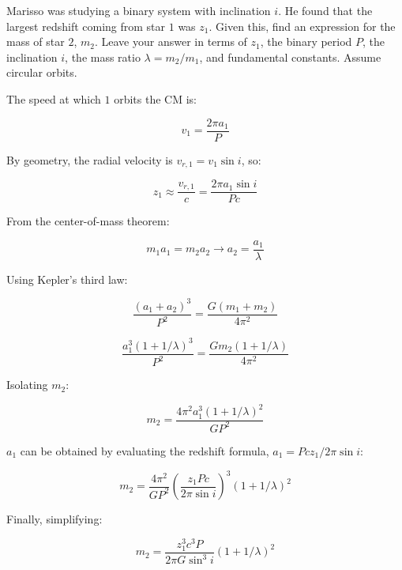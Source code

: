 \documentclass[11pt]{article}
\begin{document}
\begin{pproblem} Marisso was studying a binary system with inclination \(i\). He found that the largest redshift coming from star \(1\) was \(z_1\). Given this, find an expression for the mass of star \(2\), \(m_2\). Leave your answer in terms of \(z_1\), the binary period \(P\), the inclination \(i\), the mass ratio \(\lambda  = m_2/m_1\), and fundamental constants. Assume circular orbits.
    \begin{pssolution*}{}{}
        The speed at which \(1\) orbits the CM is:

        \[v_1 = \frac{2\pi a_1}{P}\]

        By geometry, the radial velocity is \(v_{r,1}=v_1\sin i\), so:

        \[z_1 \approx \frac{v_{r,1}}{c} = \frac{2\pi a_1\sin i}{Pc}\]

        From the center-of-mass theorem:

        \[m_1a_1=m_2a_2 \rightarrow a_2 = \frac{a_1}{\lambda}\]

        Using Kepler's third law:

        \[\frac{(a_1+a_2)^3}{P^2} = \frac{G(m_1+m_2)}{4\pi^2}\]

        \[\frac{a_1^3(1+1/\lambda)^3}{P^2} = \frac{Gm_2(1+1/\lambda)}{4\pi^2}\]

        Isolating \(m_2\):

        \[m_2 = \frac{4\pi^2a_1^3(1+1/\lambda)^2}{GP^2}\]

        \(a_1\) can be obtained by evaluating the redshift formula, \(a_1 = Pcz_1/2\pi\sin i\):

        \[m_2 = \frac{4\pi^2}{GP^2}\left(\frac{z_1Pc}{2\pi\sin i}\right)^3(1+1/\lambda)^2\]

        Finally, simplifying:

        \[\boxed{m_2 = \frac{z_1^3c^3P}{2\pi G \sin^3i}(1+1/\lambda)^2}\]
    \end{pssolution*}
\end{pproblem}
\end{document}
